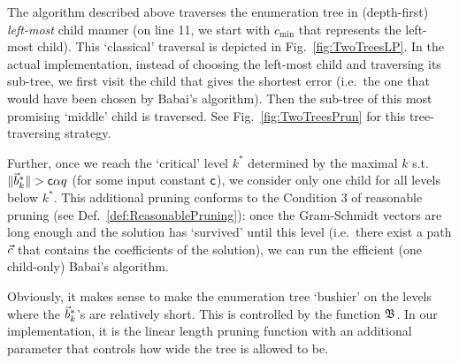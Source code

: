 The algorithm described above traverses the enumeration tree in (depth-first) \emph{left-most} child manner (on line 11, we start with $c_{\text{min}}$ that represents the left-most child). This `classical' traversal is depicted in Fig.~\ref{fig:TwoTreesLP}. In the actual implementation, instead of choosing the left-most child and traversing its sub-tree, we first visit the child that gives the shortest error (i.e.\ the one that would have been chosen by Babai's algorithm). Then the sub-tree of this most promising `middle' child is traversed. See Fig.~\ref{fig:TwoTreesPrun} for this tree-traversing strategy. 
 
Further, once we reach the `critical' level $k^*$ determined by the maximal $k$ s.t. $\|\vec b^*_k \| > \mathsf{c} \alpha q$ (for some input constant $\mathsf{c}$), we consider only one child for all levels below $k^*$. This additional pruning conforms to the Condition 3 of reasonable pruning (see Def.~\ref{def:ReasonablePruning}): once the Gram-Schmidt vectors are long enough and the solution has `survived' until this level (i.e.\ there exist a path $\cvec$ that contains the coefficients of the solution), we can run the efficient (one child-only) Babai's algorithm. 

Obviously, it makes sense to make the enumeration tree `bushier' on the levels where the $\vec b^*_k$'s are relatively short. This is controlled by the function $\mathfrak{B}$. In our implementation, it is the linear length pruning function with an additional parameter that controls how wide the tree is allowed to be. 
